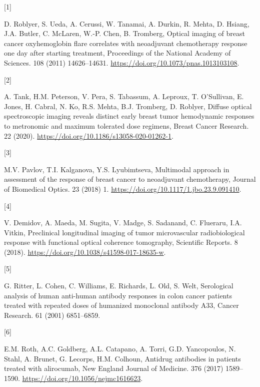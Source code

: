\documentclass[
]{article}
\newlength{\cslhangindent}
\newlength{\csllabelwidth}
\newlength{\cslentryspacingunit} %
\newenvironment{CSLReferences}[2] %
 {%
  \setlength{\parindent}{0pt}
  \ifodd #1
  \let\oldpar\par
  \def\par{\hangindent=\cslhangindent\oldpar}
  \fi
  \setlength{\parskip}{#2\cslentryspacingunit}
 }%
 {}
\newcommand{\CSLLeftMargin}[1]{\parbox[t]{\csllabelwidth}{#1}}
\newcommand{\CSLRightInline}[1]{\parbox[t]{\linewidth - \csllabelwidth}{#1}\break}
\begin{document}
\hypertarget{refs}{}
\begin{CSLReferences}{0}{0}
\leavevmode{}%
\CSLLeftMargin{{[}1{]} }
\CSLRightInline{D. Roblyer, S. Ueda, A. Cerussi, W. Tanamai, A. Durkin, R. Mehta, D. Hsiang, J.A. Butler, C. McLaren, W.-P. Chen, B. Tromberg, Optical imaging of breast cancer oxyhemoglobin flare correlates with neoadjuvant chemotherapy response one day after starting treatment, Proceedings of the National Academy of Sciences. 108 (2011) 14626--14631. \url{https://doi.org/10.1073/pnas.1013103108}.}

\leavevmode{}%
\CSLLeftMargin{{[}2{]} }
\CSLRightInline{A. Tank, H.M. Peterson, V. Pera, S. Tabassum, A. Leproux, T. O'Sullivan, E. Jones, H. Cabral, N. Ko, R.S. Mehta, B.J. Tromberg, D. Roblyer, Diffuse optical spectroscopic imaging reveals distinct early breast tumor hemodynamic responses to metronomic and maximum tolerated dose regimens, Breast Cancer Research. 22 (2020). \url{https://doi.org/10.1186/s13058-020-01262-1}.}

\leavevmode{}%
\CSLLeftMargin{{[}3{]} }
\CSLRightInline{M.V. Pavlov, T.I. Kalganova, Y.S. Lyubimtseva, Multimodal approach in assessment of the response of breast cancer to neoadjuvant chemotherapy, Journal of Biomedical Optics. 23 (2018) 1. \url{https://doi.org/10.1117/1.jbo.23.9.091410}.}

\leavevmode{}%
\CSLLeftMargin{{[}4{]} }
\CSLRightInline{V. Demidov, A. Maeda, M. Sugita, V. Madge, S. Sadanand, C. Flueraru, I.A. Vitkin, Preclinical longitudinal imaging of tumor microvascular radiobiological response with functional optical coherence tomography, Scientific Reports. 8 (2018). \url{https://doi.org/10.1038/s41598-017-18635-w}.}

\leavevmode{}%
\CSLLeftMargin{{[}5{]} }
\CSLRightInline{G. Ritter, L. Cohen, C. Williams, E. Richards, L. Old, S. Welt, {Serological analysis of human anti-human antibody responses in colon cancer patients treated with repeated doses of humanized monoclonal antibody A33}, {Cancer Research}. {61} (2001) 6851--6859.}

\leavevmode{}%
\CSLLeftMargin{{[}6{]} }
\CSLRightInline{E.M. Roth, A.C. Goldberg, A.L. Catapano, A. Torri, G.D. Yancopoulos, N. Stahl, A. Brunet, G. Lecorps, H.M. Colhoun, Antidrug antibodies in patients treated with alirocumab, New England Journal of Medicine. 376 (2017) 1589--1590. \url{https://doi.org/10.1056/nejmc1616623}.}


\end{CSLReferences}
\end{document}
